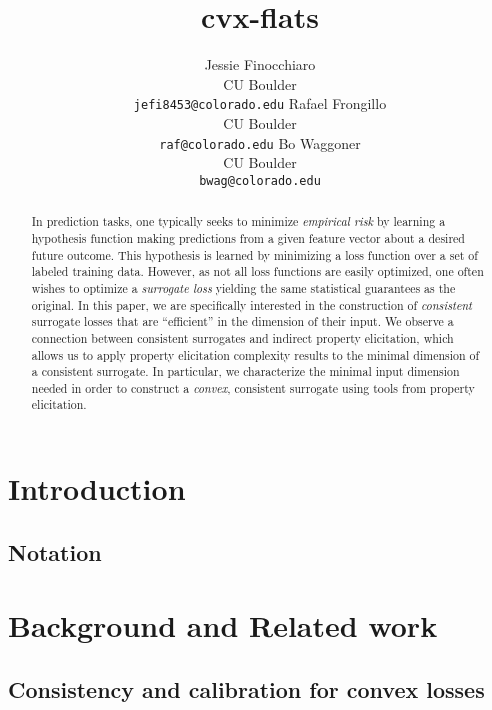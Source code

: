 \documentclass{article}
\title{cvx-flats}
\author{%
  Jessie Finocchiaro\\
  CU Boulder\\
  \texttt{jefi8453@colorado.edu} 
  \And
   Rafael Frongillo\\
   CU Boulder\\
   \texttt{raf@colorado.edu} 
   \And
   Bo Waggoner\\
   CU Boulder \\
   \texttt{bwag@colorado.edu} 
}
\begin{document}
\maketitle

\begin{abstract}
	In prediction tasks, one typically seeks to minimize \emph{empirical risk} by learning a hypothesis function making predictions from a given feature vector about a desired future outcome.
	This hypothesis is learned by minimizing a loss function over a set of labeled training data.
	However, as not all loss functions are easily optimized, one often wishes to optimize a \emph{surrogate loss} yielding the same statistical guarantees as the original.
	In this paper, we are specifically interested in the construction of \emph{consistent} surrogate losses that are ``efficient'' in the dimension of their input.
	We observe a connection between consistent surrogates and indirect property elicitation, which allows us to apply property elicitation complexity results to the minimal dimension of a consistent surrogate.
	In particular, we characterize the minimal input dimension needed in order to construct a \emph{convex}, consistent surrogate using tools from property elicitation.
\end{abstract}

\section{Introduction}\label{sec:intro}


\subsection{Notation}

\section{Background and Related work}\label{sec:related-work}

\subsection{Consistency and calibration for convex losses}\label{subsec:convex-surrogates}
\end{document}
